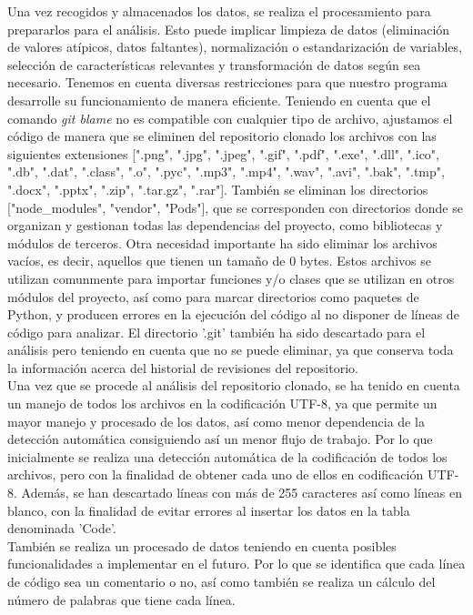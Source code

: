 \documentclass[a4paper, 12pt]{book}
\begin{document}
Una vez recogidos y almacenados los datos, se realiza el procesamiento para prepararlos para el análisis. Esto puede implicar limpieza de datos (eliminación de valores atípicos, datos faltantes), normalización o estandarización de variables, selección de características relevantes y
transformación de datos según sea necesario.
Tenemos en cuenta diversas restricciones para que nuestro programa desarrolle su funcionamiento de manera eficiente. Teniendo en cuenta que el comando \textit{git blame} no es compatible con cualquier tipo de archivo, ajustamos el código
de manera que se eliminen del repositorio clonado los archivos con las siguientes extensiones [".png", ".jpg", ".jpeg", ".gif", ".pdf", ".exe", ".dll", ".ico", ".db", ".dat", ".class", ".o", ".pyc", ".mp3", ".mp4", ".wav", ".avi", ".bak", ".tmp", ".docx", ".pptx", ".zip",
".tar.gz", ".rar"]. También se eliminan los directorios ["node\_modules", "vendor", "Pods"], que se corresponden con directorios donde se organizan y gestionan todas las dependencias del proyecto, como bibliotecas y módulos de terceros. Otra necesidad importante ha sido
eliminar los archivos vacíos, es decir, aquellos que tienen un tamaño de 0 bytes. Estos archivos se utilizan comunmente para importar funciones y/o clases que se utilizan en otros módulos del proyecto, así como para marcar directorios como paquetes de Python, y producen errores
en la ejecución del código al no disponer de líneas de código para analizar. El directorio '.git' también ha sido descartado para el análisis pero teniendo en cuenta que no se puede eliminar, ya que conserva toda la información acerca del historial de revisiones del repositorio.
\\Una vez que se procede al análisis del repositorio clonado, se ha tenido en cuenta un manejo de todos los archivos en la codificación UTF-8, ya que permite un mayor manejo y procesado de los datos, así como menor dependencia de la detección automática consiguiendo así un menor flujo de trabajo.
Por lo que inicialmente se realiza una detección automática de la codificación de todos los archivos, pero con la finalidad de obtener cada uno de ellos en codificación UTF-8. Además, se han descartado líneas con más de 255 caracteres así como líneas en blanco, con la finalidad
de evitar errores al insertar los datos en la tabla denominada 'Code'. 
\\También se realiza un procesado de datos teniendo en cuenta posibles funcionalidades a implementar en el futuro. Por lo que se identifica que cada línea de código sea un comentario o no, así como también se realiza un cálculo del número de palabras que tiene cada línea.
\end{document}
